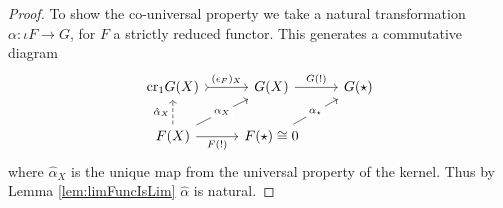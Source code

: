 \begin{proof}
    To show the co-universal property we take a natural transformation $\alpha:\iota F\rightarrow G$, for $F$ a strictly reduced functor. This generates a commutative diagram
    \[\begin{tikzcd}
	{\text{cr}_1G(X)} & {G(X)} & {G(\star)} \\
	{F(X)} & {F(\star)\cong 0}
	\arrow["{(\epsilon_F)_X}", tail, from=1-1, to=1-2]
	\arrow["{G(!)}", from=1-2, to=1-3]
	\arrow["{\alpha_X}"{description}, from=2-1, to=1-2]
	\arrow["{F(!)}"', from=2-1, to=2-2]
	\arrow["{\alpha_\star}"{description}, from=2-2, to=1-3]
	\arrow["{\hat{\alpha}_X}", dashed, from=2-1, to=1-1]
\end{tikzcd}\]
    where $\hat{\alpha}_X$ is the unique map from the universal property of the kernel. Thus by Lemma \ref{lem:limFuncIsLim} $\hat{\alpha}$ is natural.

\end{proof}
